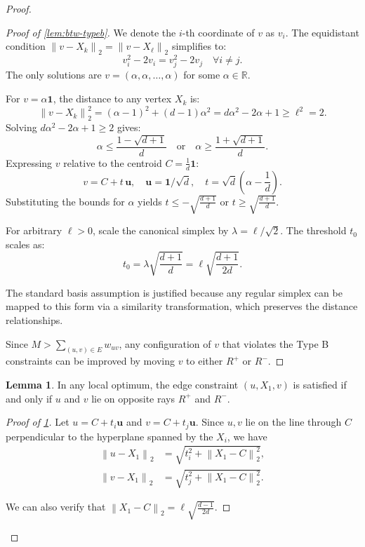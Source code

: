 \documentclass{article}
\theoremstyle{definition}  %
\newtheorem{lemma}{Lemma}
\theoremstyle{plain}
\numberwithin{observation}{section}
\numberwithin{claim}{section}
\numberwithin{fact}{section}
\numberwithin{lemma}{section}
\numberwithin{proposition}{section}
\numberwithin{theorem}{section}
\numberwithin{corollary}{section}
\numberwithin{definition}{section}
\newcommand{\norm}[1]{\left\| #1 \right\|}
\theoremstyle{plain}
\begin{document}
\begin{proof}
\begin{proof}[Proof of \cref{lem:btw-typeb}]
We denote the $i$-th coordinate of $v$ as $v_i$. The equidistant condition $\norm{v - X_k}_2 = \norm{v - X_\ell}_2$ simplifies to:
\[
v_i^2 - 2v_i = v_j^2 - 2v_j \quad \forall i \neq j.
\]
The only solutions are $v = (\alpha, \alpha, \ldots, \alpha)$ for some $\alpha \in \mathbb{R}$.

For $v = \alpha \mathbf{1}$, the distance to any vertex $X_k$ is:
\[
\norm{v - X_k}_2^2 = (\alpha - 1)^2 + (d-1)\alpha^2 = d\alpha^2 - 2\alpha + 1 \geq \ell^2 = 2.
\]
Solving $d\alpha^2 - 2\alpha + 1 \geq 2$ gives:
\[
\alpha \leq \frac{1 - \sqrt{d+1}}{d} \quad \text{or} \quad \alpha \geq \frac{1 + \sqrt{d+1}}{d}.
\]
Expressing $v$ relative to the centroid $C = \frac{1}{d}\mathbf{1}$:
\[
v = C + t \, \mathbf{u}, \quad \mathbf{u} = \mathbf{1}/\sqrt{d}, \quad t = \sqrt{d}\left(\alpha - \frac{1}{d}\right).
\]
Substituting the bounds for $\alpha$ yields $t \leq -\sqrt{\frac{d+1}{d}}$ or $t \geq \sqrt{\frac{d+1}{d}}$.

For arbitrary $\ell > 0$, scale the canonical simplex by $\lambda = \ell/\sqrt{2}$. The threshold $t_0$ scales as:
\[
t_0 = \lambda \sqrt{\frac{d+1}{d}} = \ell \sqrt{\frac{d+1}{2d}}.
\]

The standard basis assumption is justified because any regular simplex can be mapped to this form via a similarity transformation, which preserves the distance relationships.

Since $M > \sum_{(u,v) \in E} w_{uv}$, any configuration of $v$ that violates the Type B constraints can be improved by moving $v$ to either $R^+$ or $R^-$.
\end{proof}

\begin{lemma}\label{lem:btw-typea}
In any local optimum, the edge constraint $(u, X_1, v)$ is satisfied if and only if $u$ and $v$ lie on opposite rays $R^+$ and $R^-$.
\end{lemma}

\begin{proof}[Proof of \cref{lem:btw-typea}]
Let $u = C + t_i\mathbf{u}$ and $v = C + t_j\mathbf{u}$. Since $u, v$ lie on the line through $C$ perpendicular to the hyperplane spanned by the $X_i$, we have
\begin{align*}
    \norm{u - X_1}_2 &= \sqrt{t_i^2 + \norm{X_1 - C}_2^2}, \\
    \norm{v - X_1}_2 &= \sqrt{t_j^2 + \norm{X_1 - C}_2^2}.
\end{align*}

We can also verify that $\norm{X_1 - C}_2 = \ell \sqrt{\frac{d-1}{2d}}$.


\end{proof}
\end{proof}
\end{document}
